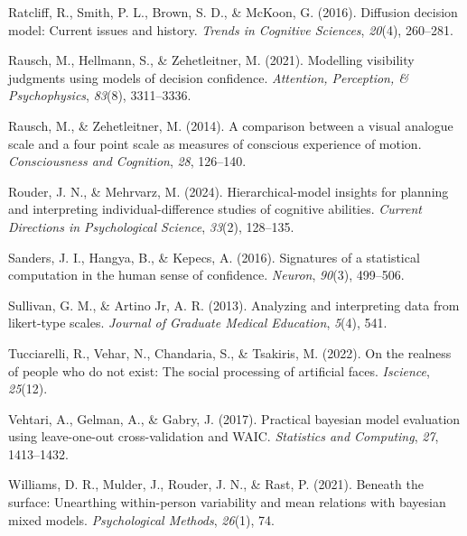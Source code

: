 \documentclass[
  jou,
  floatsintext,
  longtable,
  nolmodern,
  notxfonts,
  notimes,
  colorlinks=true,linkcolor=blue,citecolor=blue,urlcolor=blue]{apa7}
\newlength{\cslhangindent}
\newenvironment{CSLReferences}[2] %
 {\begin{list}{}{%
  \setlength{\itemindent}{0pt}
  \setlength{\leftmargin}{0pt}
  \setlength{\parsep}{0pt}
  \ifodd #1
   \setlength{\leftmargin}{\cslhangindent}
   \setlength{\itemindent}{-1\cslhangindent}
  \fi
  \setlength{\itemsep}{#2\baselineskip}}}
 {\end{list}}
\begin{document}
\begin{CSLReferences}{1}{0}
Ratcliff, R., Smith, P. L., Brown, S. D., \& McKoon, G. (2016).
Diffusion decision model: Current issues and history. \emph{Trends in
Cognitive Sciences}, \emph{20}(4), 260--281.

Rausch, M., Hellmann, S., \& Zehetleitner, M. (2021). Modelling
visibility judgments using models of decision confidence.
\emph{Attention, Perception, \& Psychophysics}, \emph{83}(8),
3311--3336.

Rausch, M., \& Zehetleitner, M. (2014). A comparison between a visual
analogue scale and a four point scale as measures of conscious
experience of motion. \emph{Consciousness and Cognition}, \emph{28},
126--140.

Rouder, J. N., \& Mehrvarz, M. (2024). Hierarchical-model insights for
planning and interpreting individual-difference studies of cognitive
abilities. \emph{Current Directions in Psychological Science},
\emph{33}(2), 128--135.

Sanders, J. I., Hangya, B., \& Kepecs, A. (2016). Signatures of a
statistical computation in the human sense of confidence. \emph{Neuron},
\emph{90}(3), 499--506.

Sullivan, G. M., \& Artino Jr, A. R. (2013). Analyzing and interpreting
data from likert-type scales. \emph{Journal of Graduate Medical
Education}, \emph{5}(4), 541.

Tucciarelli, R., Vehar, N., Chandaria, S., \& Tsakiris, M. (2022). On
the realness of people who do not exist: The social processing of
artificial faces. \emph{Iscience}, \emph{25}(12).

Vehtari, A., Gelman, A., \& Gabry, J. (2017). Practical bayesian model
evaluation using leave-one-out cross-validation and WAIC.
\emph{Statistics and Computing}, \emph{27}, 1413--1432.

Williams, D. R., Mulder, J., Rouder, J. N., \& Rast, P. (2021). Beneath
the surface: Unearthing within-person variability and mean relations
with bayesian mixed models. \emph{Psychological Methods}, \emph{26}(1),
74.

\end{CSLReferences}
\end{document}
